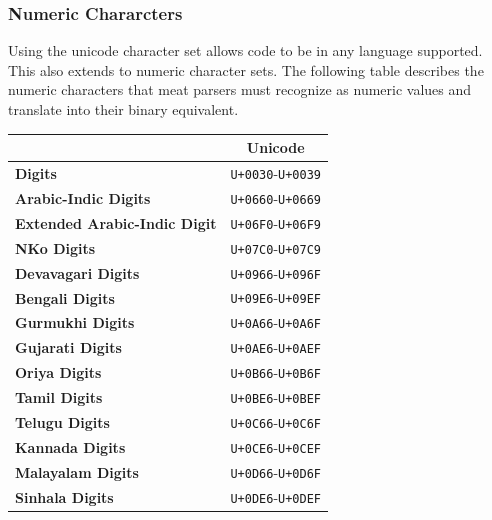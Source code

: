 \documentclass [10pt]{article}
\begin{document}
\subsubsection {Numeric Chararcters}

Using the unicode character set allows code to be in any language supported.
This also extends to numeric character sets. The following table describes the
numeric characters that meat parsers must recognize as numeric values and
translate into their binary equivalent.

\begin{center}
  \begin{longtable}{|l|c|}
  	\hline
  	                                             &         \textbf{Unicode}          \\ \hline
  	\textbf{Digits}                              &  \texttt{U+0030}-\texttt{U+0039}  \\ \hline
  	\textbf{Arabic-Indic Digits}                 &  \texttt{U+0660}-\texttt{U+0669}  \\ \hline
  	\textbf{Extended Arabic-Indic Digit}         &  \texttt{U+06F0}-\texttt{U+06F9}  \\ \hline
  	\textbf{NKo Digits}                          &  \texttt{U+07C0}-\texttt{U+07C9}  \\ \hline
  	\textbf{Devavagari Digits}                   &  \texttt{U+0966}-\texttt{U+096F}  \\ \hline
  	\textbf{Bengali Digits}                      &  \texttt{U+09E6}-\texttt{U+09EF}  \\ \hline
  	\textbf{Gurmukhi Digits}                     &  \texttt{U+0A66}-\texttt{U+0A6F}  \\ \hline
  	\textbf{Gujarati Digits}                     &  \texttt{U+0AE6}-\texttt{U+0AEF}  \\ \hline
  	\textbf{Oriya Digits}                        &  \texttt{U+0B66}-\texttt{U+0B6F}  \\ \hline
  	\textbf{Tamil Digits}                        &  \texttt{U+0BE6}-\texttt{U+0BEF}  \\ \hline
  	\textbf{Telugu Digits}                       &  \texttt{U+0C66}-\texttt{U+0C6F}  \\ \hline
  	\textbf{Kannada Digits}                      &  \texttt{U+0CE6}-\texttt{U+0CEF}  \\ \hline
  	\textbf{Malayalam Digits}                    &  \texttt{U+0D66}-\texttt{U+0D6F}  \\ \hline
  	\textbf{Sinhala Digits}                      &  \texttt{U+0DE6}-\texttt{U+0DEF}  \\ \hline

\end{longtable}
\end{center}
\end{document}
